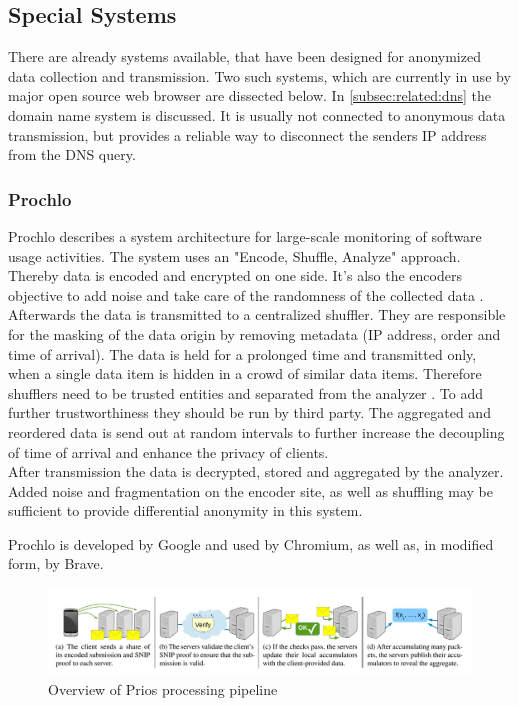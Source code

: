     
    \subsection{Special Systems}
        \label{subsec:related:special}
        There are already systems available, that have been designed for anonymized data collection and transmission. 
        Two such systems, which are currently in use by major open source web browser are dissected below. In \ref{subsec:related:dns} the domain name system is discussed. It is usually not connected to anonymous data transmission, but provides a reliable way to disconnect the senders IP address from the DNS query.
        
    \subsubsection{Prochlo}
        Prochlo describes a system architecture for large-scale monitoring of software usage activities. The system uses an "Encode, Shuffle, Analyze" approach. Thereby data is encoded and encrypted on one side. It's also the encoders objective to add noise and take care of the randomness of the collected data \cite{bittau_prochlo_2017}.\\
        Afterwards the data is transmitted to a centralized shuffler. They are responsible for the masking of the data origin by removing metadata (IP address, order and time of arrival).
        The data is held for a prolonged time and transmitted only, when a single data item is hidden in a crowd of similar data items. Therefore shufflers need to be trusted entities and separated from the analyzer \cite{bittau_prochlo_2017}. To add further trustworthiness they should be run by third party. The aggregated and reordered data is send out at random intervals to further increase the decoupling of time of arrival and enhance the privacy of clients.\\
        After transmission the data is decrypted, stored and aggregated by the analyzer. 
        Added noise and fragmentation on the encoder site, as well as shuffling may be sufficient to provide differential anonymity in this system.
        
        Prochlo is developed by Google and used by Chromium, as well as, in modified form, by Brave.
        \begin{figure}[hb]
            \centering
            \includegraphics[width=\textwidth]{latex/figures/prio_overview.jpg}
            \caption[Overview of Prios processing pipeline]{Overview of Prios processing pipeline \cite{corrigan-gibbs_prio_2017}}
            \label{fig:prio_overview}
        \end{figure}
    
